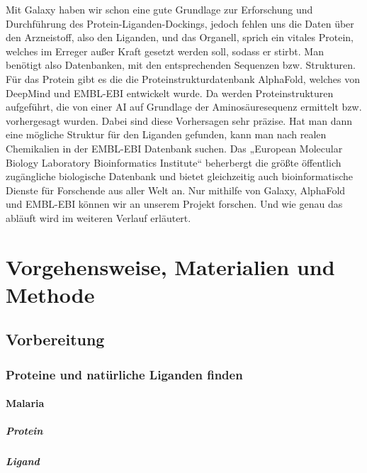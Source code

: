 \documentclass[11pt]{article}
\begin{document}
        Mit Galaxy haben wir schon eine gute Grundlage zur Erforschung und Durchführung des Protein-Liganden-Dockings, jedoch fehlen uns die Daten über den Arzneistoff, also den Liganden, und das Organell, sprich ein vitales Protein, welches im Erreger außer Kraft gesetzt werden soll, sodass er stirbt. Man benötigt also Datenbanken, mit den entsprechenden Sequenzen bzw. Strukturen. Für das Protein gibt es die die Proteinstrukturdatenbank AlphaFold, welches von DeepMind und EMBL-EBI entwickelt wurde. Da werden Proteinstrukturen aufgeführt, die von einer AI auf Grundlage der Aminosäuresequenz ermittelt bzw. vorhergesagt wurden. Dabei sind diese Vorhersagen sehr präzise. Hat man dann eine mögliche Struktur für den Liganden gefunden, kann man nach realen Chemikalien in der EMBL-EBI Datenbank suchen. Das „European Molecular Biology Laboratory Bioinformatics Institute“ beherbergt die größte öffentlich zugängliche biologische Datenbank und bietet gleichzeitig auch bioinformatische Dienste für Forschende aus aller Welt an. Nur mithilfe von Galaxy, AlphaFold und EMBL-EBI können wir an unserem Projekt forschen. Und wie genau das abläuft wird im weiteren Verlauf erläutert.


    \section{Vorgehensweise, Materialien und Methode}\label{sec:vorgehensweise-materialien-und-methode}

    \subsection{Vorbereitung}\label{subsec:vorbereitung}


    \subsubsection{Proteine und natürliche Liganden finden}

    \paragraph{Malaria}

    \subparagraph{Protein}

    \subparagraph{Ligand}
\end{document}
